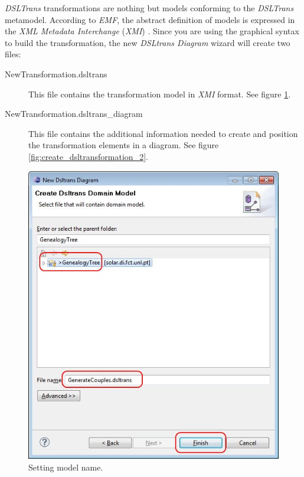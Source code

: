 \emph{DSLTrans} transformations are nothing but models conforming to the
\emph{DSLTrans} metamodel. According to \emph{EMF}, the abstract
definition of models is expressed in the \emph{XML Metadata
Interchange} (\emph{XMI}) \cite{xmi_omg}. Since you are using the graphical
syntax to build the transformation, the new \emph{DSLtrans Diagram} wizard will create two files:
\begin{description}
  \item[NewTransformation.dsltrans]	This file contains the transformation model
  in \emph{XMI} format. See figure \ref{fig:create_dsltransformation_3}.
  \item[NewTransformation.dsltrans\_diagram] This file contains the additional
  information needed to create and position the transformation elements in a
  diagram. See figure \ref{fig:create_dsltransformation_2}.
\end{description}

\begin{figure}[h]
\begin{center}
  \includegraphics[scale=0.6]{imgs/create_dsltransformation_3.jpg}
  \caption{Setting model name.}
  \label{fig:create_dsltransformation_3}
\end{center}
\end{figure}

